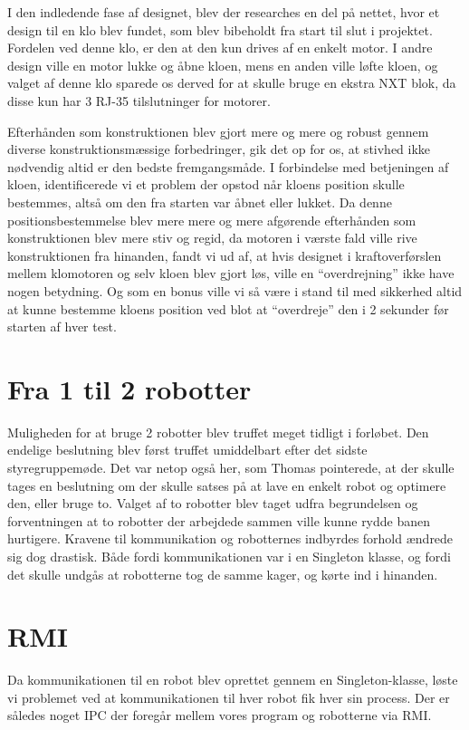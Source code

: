 I den indledende fase af designet, blev der researches en del på nettet, hvor et design til en klo blev fundet, som blev bibeholdt fra start til slut i projektet. Fordelen ved denne klo, er den at den kun drives af en enkelt motor. I andre design ville en motor lukke og åbne kloen, mens en anden ville løfte kloen, og valget af denne klo sparede os derved for at skulle bruge en ekstra NXT blok, da disse kun har 3 RJ-35 tilslutninger for motorer.

Efterhånden som konstruktionen blev gjort mere og mere og robust gennem diverse konstruktionsmæssige forbedringer, gik det op for os, at stivhed ikke nødvendig altid er den bedste fremgangsmåde.
I forbindelse med betjeningen af kloen, identificerede vi et problem der opstod når kloens position skulle bestemmes, altså om den fra starten var åbnet eller lukket. Da denne positionsbestemmelse blev mere mere og mere afgørende efterhånden som konstruktionen blev mere stiv og regid, da motoren i værste fald ville rive konstruktionen fra hinanden, fandt vi ud af, at hvis designet i kraftoverførslen mellem klomotoren og selv kloen blev gjort løs, ville en "`overdrejning"' ikke have nogen betydning. Og som en bonus ville vi så være i stand til med sikkerhed altid at kunne bestemme kloens position ved blot at "`overdreje"' den i 2 sekunder før starten af hver test.

\section{Fra 1 til 2 robotter}
Muligheden for at bruge 2 robotter blev truffet meget tidligt i forløbet. Den endelige beslutning blev først truffet umiddelbart efter det sidste styregruppemøde. Det var netop også her, som Thomas pointerede, at der skulle tages en beslutning om der skulle satses på at lave en enkelt robot og optimere den, eller bruge to. Valget af to robotter blev taget udfra begrundelsen og forventningen at to robotter der arbejdede sammen ville kunne rydde banen hurtigere. Kravene til kommunikation og robotternes indbyrdes forhold ændrede sig dog drastisk. Både fordi kommunikationen var i en Singleton klasse, og fordi det skulle undgås at robotterne tog de samme kager, og kørte ind i hinanden.

\section{RMI}
Da kommunikationen til en robot blev oprettet gennem en Singleton-klasse, løste vi problemet ved at kommunikationen til hver robot fik hver sin process. Der er således noget IPC der foregår mellem vores program og robotterne via RMI.

